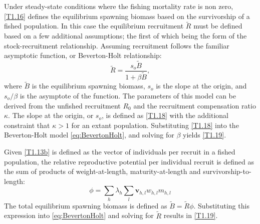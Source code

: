 \documentclass[12pt,letterpaper]{article}
\begin{document}
    Under steady-state conditions where the fishing mortality rate is non zero, \eqref{T1.16} defines the equilibrium spawning biomass based on the survivorship of a fished population.  In this case the equilibrium recruitment $\tilde{R}$ must be defined based on a few additional assumptions; the first of which being the form of the stock-recruitment relationship.  Assuming recruitment follows the familiar asymptotic function, or Beverton-Holt relationship:
    \begin{equation} \label{eq:BevertonHolt}
      \tilde{R} = \frac{s_o \tilde{B}}{1 + \beta \tilde{B}},
    \end{equation}
    where $\tilde{B}$ is the equilibrium spawning biomass, $s_o$ is the slope at the origin, and $s_o/\beta$ is the asymptote of the function. The parameters of this model can be derived from the unfished recruitment $R_0$ and the recruitment compensation ratio $\kappa$.  The slope at the origin, or $s_o$, is defined as \eqref{T1.18} with the additional constraint that $\kappa > 1$ for an extant population.  Substituting \eqref{T1.18} into the Beverton-Holt model \eqref{eq:BevertonHolt}, and solving  for $\beta$ yields \eqref{T1.19}.

    Given \eqref{T1.13b} is defined as the vector of individuals per recruit in a fished population, the relative reproductive potential per individual recruit is defined as the sum of products of weight-at-length, maturity-at-length and survivorship-to-length:
    \[
    \phi = \sum_h \lambda_h \sum_l  \bm{v}_{h,l} w_{h,l} m_{h,l}
    \]
    The total equilibrium spawning biomass is defined as $\tilde{B} = \tilde{R} \phi$.  Substituting this expression into \eqref{eq:BevertonHolt} and solving for $\tilde{R}$ results in \eqref{T1.19}.





\end{document}

